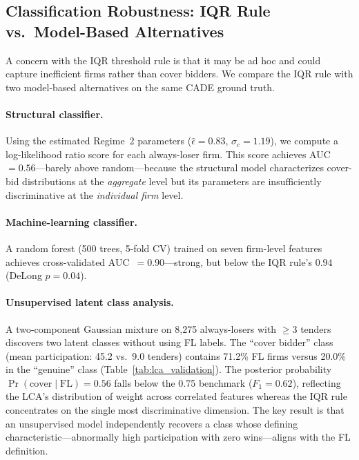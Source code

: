 
\subsection{Classification Robustness: IQR Rule vs.\ Model-Based Alternatives}
\label{sec:classification_robustness}

A concern with the IQR threshold rule is that it may be ad hoc and
could capture inefficient firms rather than cover bidders. We compare
the IQR rule with two model-based alternatives on the same CADE
ground truth.

\paragraph{Structural classifier.}
Using the estimated Regime~2 parameters ($\hat{\epsilon} = 0.83$,
$\hat{\sigma}_c = 1.19$), we compute a log-likelihood ratio score for
each always-loser firm. This score achieves AUC~$= 0.56$---barely
above random---because the structural model characterizes cover-bid
distributions at the \emph{aggregate} level but its parameters are
insufficiently discriminative at the \emph{individual firm} level.

\paragraph{Machine-learning classifier.}
A random forest (500 trees, 5-fold CV) trained on seven firm-level
features achieves cross-validated AUC~$= 0.90$---strong, but below
the IQR rule's $0.94$ (DeLong $p = 0.04$).

\paragraph{Unsupervised latent class analysis.}
A two-component Gaussian mixture on 8,275 always-losers with $\geq 3$
tenders discovers two latent classes without using FL labels. The
``cover bidder'' class (mean participation: 45.2 vs.\ 9.0 tenders)
contains 71.2\% FL firms versus 20.0\% in the ``genuine'' class
(Table~\ref{tab:lca_validation}). The posterior probability
$\Pr(\text{cover} \mid \text{FL}) = 0.56$ falls below the 0.75
benchmark ($F_1 = 0.62$), reflecting the LCA's distribution of weight
across correlated features whereas the IQR rule concentrates on the
single most discriminative dimension. The key result is that an
unsupervised model independently recovers a class whose defining
characteristic---abnormally high participation with zero
wins---aligns with the FL definition.


